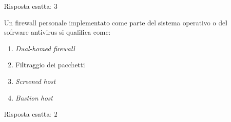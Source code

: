 \begin{Answer} [
  ref={netriep5},
  number={5}
  ]

  \Question Risposta esatta: 3

\end{Answer}


\begin{Exercise} [
  title={Quiz},
  label={netriep6}
  ]

  \Question Un firewall personale implementato come parte del sistema
operativo o del sofrware antivirus si qualifica come:
\begin{enumerate}
 \item \textit{Dual-homed firewall}
 \item Filtraggio dei pacchetti
 \item \textit{Screened host}
 \item \textit{Bastion host}
\end{enumerate}

\end{Exercise}


\begin{Answer} [
  ref={netriep6},
  number={6}
  ]

  \Question Risposta esatta: 2

\end{Answer}
